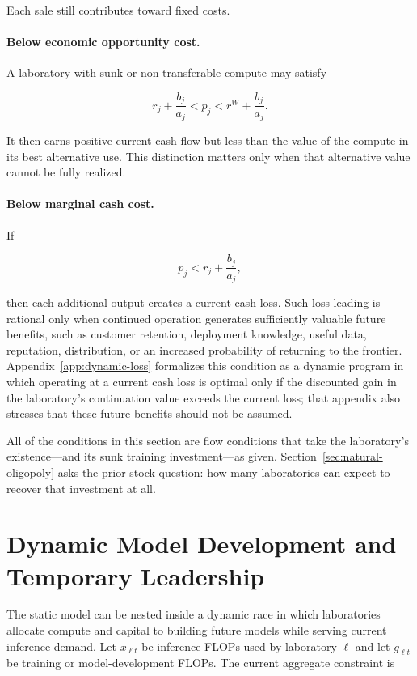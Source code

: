 \documentclass[11pt]{article}
\begin{document}
Each sale still contributes toward fixed costs.

\paragraph{Below economic opportunity cost.} A laboratory with sunk or non-transferable compute may satisfy

\begin{equation}r_j+\frac{b_j}{a_j}<p_j<r^W+\frac{b_j}{a_j}.\end{equation}

It then earns positive current cash flow but less than the value of the compute in its best alternative use. This distinction matters only when that alternative value cannot be fully realized.

\paragraph{Below marginal cash cost.} If

\begin{equation}p_j<r_j+\frac{b_j}{a_j},\end{equation}

then each additional output creates a current cash loss. Such loss-leading is rational only when continued operation generates sufficiently valuable future benefits, such as customer retention, deployment knowledge, useful data, reputation, distribution, or an increased probability of returning to the frontier. Appendix~\ref{app:dynamic-loss} formalizes this condition as a dynamic program in which operating at a current cash loss is optimal only if the discounted gain in the laboratory's continuation value exceeds the current loss; that appendix also stresses that these future benefits should not be assumed.

All of the conditions in this section are flow conditions that take the laboratory's existence---and its sunk training investment---as given. Section~\ref{sec:natural-oligopoly} asks the prior stock question: how many laboratories can expect to recover that investment at all.

\section{Dynamic Model Development and Temporary Leadership}
\label{sec:model-race}

The static model can be nested inside a dynamic race in which laboratories allocate compute and capital to building future models while serving current inference demand. Let $x_{\ell t}$ be inference FLOPs used by laboratory $\ell$ and let $g_{\ell t}$ be training or model-development FLOPs. The current aggregate constraint is
\end{document}
